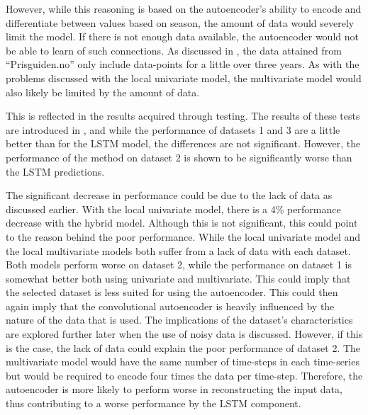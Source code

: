 However, while this reasoning is based on the autoencoder's ability to encode and differentiate between values based on season,
the amount of data would severely limit the model.
If there is not enough data available, the autoencoder would not be able to learn of such connections.
As discussed in , the data attained from ``Prisguiden.no'' only include data-points
for a little over three years.
As with the problems discussed with the local univariate model, the multivariate model would also likely be limited by the amount of data.

This is reflected in the results acquired through testing.
The results of these tests are introduced in ,
and while the performance of datasets 1 and 3 are a little better than for the LSTM model,
the differences are not significant.
However, the performance of the method on dataset 2 is shown to be significantly worse than the LSTM predictions.


The significant decrease in performance could be due to the lack of data as discussed earlier.
With the local univariate model, there is a 4\% performance decrease with the hybrid model.
Although this is not significant, this could point to the reason behind the poor performance.
While the local univariate model and the local multivariate models both suffer from a lack of data with each dataset.
Both models perform worse on dataset 2, while the performance on dataset 1 is somewhat better both using univariate and multivariate.
This could imply that the selected dataset is less suited for using the autoencoder.
This could then again imply that the convolutional autoencoder is heavily influenced by the nature of the data that is used.
The implications of the dataset's characteristics are explored further later when the use of noisy data is discussed.
However, if this is the case, the lack of data could explain the poor performance of dataset 2.
The multivariate model would have the same number of time-steps in each time-series but would be required to encode four times the data per time-step.
Therefore, the autoencoder is more likely to perform worse in reconstructing the input data,
thus contributing to a worse performance by the LSTM component.


